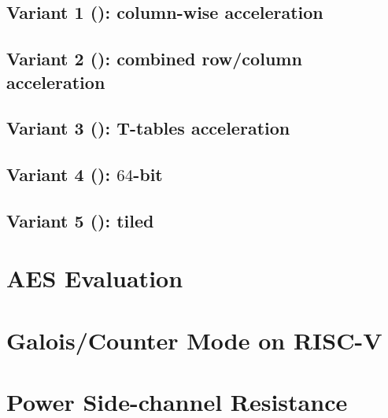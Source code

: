 \documentclass[preprint]{iacrtrans}
\begin{document}
\subsection{Variant 1 (): column-wise acceleration}
\label{sec:design:v1}


\subsection{Variant 2 (): combined row/column acceleration}
\label{sec:design:v2}


\subsection{Variant 3 (): T-tables acceleration}
\label{sec:design:v3}


\subsection{Variant 4 (): $64$-bit}
\label{sec:design:v4}


\subsection{Variant 5 (): tiled}
\label{sec:design:v5}



\section{AES Evaluation}
\label{sec:eval}




\section{Galois/Counter Mode on RISC-V}
\label{sec:eval:gcm}



\section{Power Side-channel Resistance}
\label{sec:psca}

\end{document}
